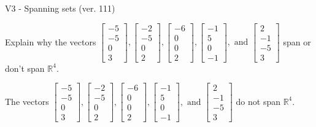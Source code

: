 \begin{exercise}
  \begin{exerciseTitle}V3 - Spanning sets (ver. 111)\end{exerciseTitle}
  \begin{exerciseStatement}
    Explain why the vectors \(\left[\begin{array}{r}
-5 \\
-5 \\
0 \\
3
\end{array}\right] , \left[\begin{array}{r}
-2 \\
-5 \\
0 \\
2
\end{array}\right] , \left[\begin{array}{r}
-6 \\
0 \\
0 \\
2
\end{array}\right] , \left[\begin{array}{r}
-1 \\
5 \\
0 \\
-1
\end{array}\right] , \text{ and } \left[\begin{array}{r}
2 \\
-1 \\
-5 \\
3
\end{array}\right]\) span or don't span \(\mathbb{R}^4\). 
	


  \end{exerciseStatement}
  \begin{exerciseAnswer}
   The vectors \(\left[\begin{array}{r}
-5 \\
-5 \\
0 \\
3
\end{array}\right] , \left[\begin{array}{r}
-2 \\
-5 \\
0 \\
2
\end{array}\right] , \left[\begin{array}{r}
-6 \\
0 \\
0 \\
2
\end{array}\right] , \left[\begin{array}{r}
-1 \\
5 \\
0 \\
-1
\end{array}\right] , \text{ and } \left[\begin{array}{r}
2 \\
-1 \\
-5 \\
3
\end{array}\right]\) 
  	 do not  
	span \(\mathbb{R}^4\).
  



\end{exerciseAnswer}
\end{exercise}
